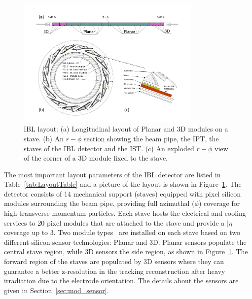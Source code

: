 \begin{figure}
\begin{center}
 \includegraphics[width=0.8\textwidth]{Images/ibl_paper/chapter03_Overview/IBL_Layout.pdf}
\caption{ IBL layout: (a) Longitudinal layout of Planar and 3D modules on a stave. (b) An $r-\phi$
               section showing the beam pipe, the IPT, the staves of the IBL detector and the IST.
               (c) An exploded $r-\phi$ view of the corner of a 3D module fixed to the stave. }
\label{fig:IBLLayout}
\end{center}
\end{figure}
The most important layout parameters of the IBL detector are listed in Table~\ref{tab:LayoutTable} and a picture of the layout is shown in Figure~\ref{fig:IBLLayout}. The detector consists of 14 mechanical support (staves) equipped with pixel silicon modules surrounding the beam pipe, providing full azimuthal ($\phi$) coverage for high transverse momentum particles. %
Each stave hosts the electrical and cooling services to 20 pixel modules that are attached to the stave and provide a $|\eta|$ coverage up to 3. Two module types~\cite{IBL_mod_proto} are installed on each stave based on two different silicon sensor technologies: Planar and 3D. Planar sensors populate the central stave region, while 3D sensors the side region, as shown in Figure~\ref{fig:IBLLayout}. The forward region of the staves are populated by 3D sensors where they can guarantee a better z-resolution in the tracking reconstruction after heavy irradiation due to the electrode orientation. The details about the sensors are given in Section~\ref{sec:mod_sensor}. %
